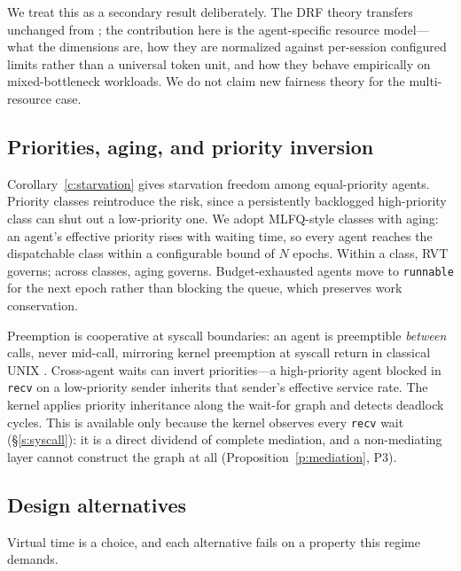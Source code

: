 \documentclass[letterpaper,11pt,leqno]{article}
\begin{document}
We treat this as a secondary result deliberately. The DRF theory transfers unchanged from \citep{Ghodsi11}; the contribution here is the agent-specific resource model---what the dimensions are, how they are normalized against per-session configured limits rather than a universal token unit, and how they behave empirically on mixed-bottleneck workloads. We do not claim new fairness theory for the multi-resource case.

\subsection{Priorities, aging, and priority inversion}\label{s:priorities}

Corollary~\ref{c:starvation} gives starvation freedom among equal-priority agents. Priority classes reintroduce the risk, since a persistently backlogged high-priority class can shut out a low-priority one. We adopt MLFQ-style classes \citep{Corbato62, Arpaci18} with aging: an agent's effective priority rises with waiting time, so every agent reaches the dispatchable class within a configurable bound of $N$ epochs. Within a class, RVT governs; across classes, aging governs. Budget-exhausted agents move to \texttt{runnable} for the next epoch rather than blocking the queue, which preserves work conservation.

Preemption is cooperative at syscall boundaries: an agent is preemptible \emph{between} calls, never mid-call, mirroring kernel preemption at syscall return in classical UNIX \citep{Ritchie74}. Cross-agent waits can invert priorities---a high-priority agent blocked in \texttt{recv} on a low-priority sender inherits that sender's effective service rate. The kernel applies priority inheritance along the wait-for graph and detects deadlock cycles. This is available only because the kernel observes every \texttt{recv} wait (\S\ref{s:syscall}): it is a direct dividend of complete mediation, and a non-mediating layer cannot construct the graph at all (Proposition~\ref{p:mediation}, P3).

\subsection{Design alternatives}\label{s:alternatives}

Virtual time is a choice, and each alternative fails on a property this regime demands.
\end{document}

